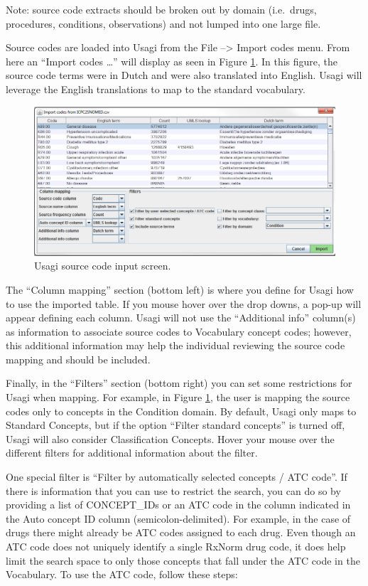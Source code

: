 \documentclass[11pt]{book}
\theoremstyle{definition}
\theoremstyle{definition}
\theoremstyle{definition}
\theoremstyle{remark}
\begin{document}
Note: source code extracts should be broken out by domain (i.e.~drugs, procedures, conditions, observations) and not lumped into one large file.

Source codes are loaded into Usagi from the File --\textgreater{} Import codes menu. From here an ``Import codes \ldots{}'' will display as seen in Figure \ref{fig:usagiImport}. In this figure, the source code terms were in Dutch and were also translated into English. Usagi will leverage the English translations to map to the standard vocabulary.

\begin{figure}
\includegraphics[width=1\linewidth]{images/ExtractTransformLoad/usagiImport} \caption{Usagi source code input screen.}\label{fig:usagiImport}
\end{figure}

The ``Column mapping'' section (bottom left) is where you define for Usagi how to use the imported table. If you mouse hover over the drop downs, a pop-up will appear defining each column. Usagi will not use the ``Additional info'' column(s) as information to associate source codes to Vocabulary concept codes; however, this additional information may help the individual reviewing the source code mapping and should be included.

Finally, in the ``Filters'' section (bottom right) you can set some restrictions for Usagi when mapping. For example, in Figure \ref{fig:usagiImport}, the user is mapping the source codes only to concepts in the Condition domain. By default, Usagi only maps to Standard Concepts, but if the option ``Filter standard concepts'' is turned off, Usagi will also consider Classification Concepts. Hover your mouse over the different filters for additional information about the filter.

One special filter is ``Filter by automatically selected concepts / ATC code''. If there is information that you can use to restrict the search, you can do so by providing a list of CONCEPT\_IDs or an ATC code in the column indicated in the Auto concept ID column (semicolon-delimited). For example, in the case of drugs there might already be ATC codes assigned to each drug. Even though an ATC code does not uniquely identify a single RxNorm drug code, it does help limit the search space to only those concepts that fall under the ATC code in the Vocabulary. To use the ATC code, follow these steps:
\end{document}
